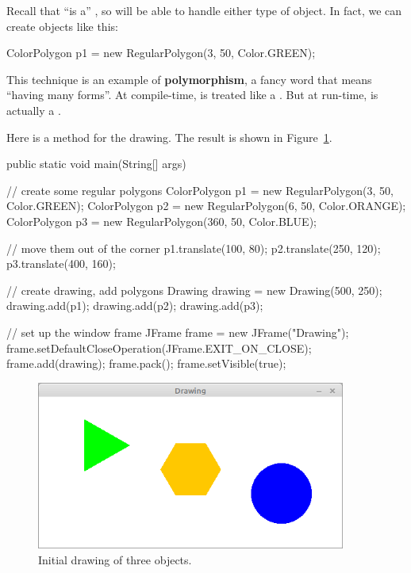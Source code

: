 Recall that  ``is a'' , so  will be able to handle either type of object.
In fact, we can create objects like this:

\begin{code}
ColorPolygon p1 = new RegularPolygon(3, 50, Color.GREEN);
\end{code}

This technique is an example of {\bf polymorphism}, a fancy word that means ``having many forms''.
At compile-time,  is treated like a .
But at run-time,  is actually a .

Here is a  method for the drawing.
The result is shown in Figure~\ref{fig:drawing}.

\begin{code}
public static void main(String[] args) {

    // create some regular polygons
    ColorPolygon p1 = new RegularPolygon(3, 50, Color.GREEN);
    ColorPolygon p2 = new RegularPolygon(6, 50, Color.ORANGE);
    ColorPolygon p3 = new RegularPolygon(360, 50, Color.BLUE);

    // move them out of the corner
    p1.translate(100, 80);
    p2.translate(250, 120);
    p3.translate(400, 160);

    // create drawing, add polygons
    Drawing drawing = new Drawing(500, 250);
    drawing.add(p1);
    drawing.add(p2);
    drawing.add(p3);

    // set up the window frame
    JFrame frame = new JFrame("Drawing");
    frame.setDefaultCloseOperation(JFrame.EXIT_ON_CLOSE);
    frame.add(drawing);
    frame.pack();
    frame.setVisible(true);
}
\end{code}

\begin{figure}[!ht]
\begin{center}
\includegraphics[width=4in]{figs/drawing.png}
\caption{Initial drawing of three  objects.}
\label{fig:drawing}
\end{center}
\end{figure}

